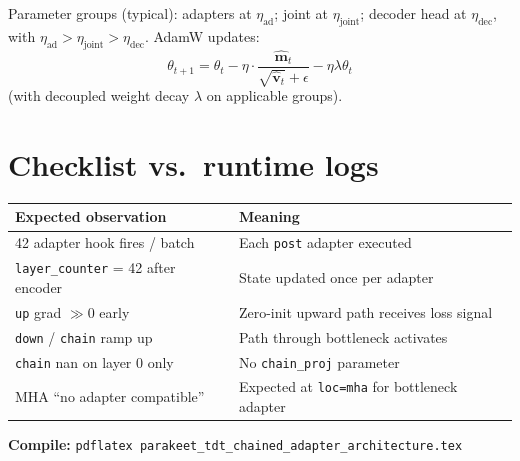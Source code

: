 \documentclass[11pt,a4paper]{article}
\begin{document}
Parameter groups (typical): adapters at $\eta_\text{ad}$; joint at $\eta_\text{joint}$; decoder head at $\eta_\text{dec}$, with $\eta_\text{ad} > \eta_\text{joint} > \eta_\text{dec}$. AdamW updates:
\[
  \theta_{t+1} = \theta_t - \eta \cdot \frac{\hat{\bm{m}}_t}{\sqrt{\hat{\bm{v}}_t} + \epsilon} - \eta \lambda \theta_t
\]
(with decoupled weight decay $\lambda$ on applicable groups).

\section{Checklist vs.\ runtime logs}

\begin{tabular}{@{}ll@{}}
\toprule
Expected observation & Meaning \\
\midrule
42 adapter hook fires / batch & Each \texttt{post} adapter executed \\
\texttt{layer\_counter} = 42 after encoder & State updated once per adapter \\
\texttt{up} grad $\gg 0$ early & Zero-init upward path receives loss signal \\
\texttt{down} / \texttt{chain} ramp up & Path through bottleneck activates \\
\texttt{chain} nan on layer 0 only & No \texttt{chain\_proj} parameter \\
MHA ``no adapter compatible'' & Expected at \texttt{loc=mha} for bottleneck adapter \\
\bottomrule
\end{tabular}

\vspace{1em}
\noindent
\textbf{Compile:} \texttt{pdflatex parakeet\_tdt\_chained\_adapter\_architecture.tex}
\end{document}
